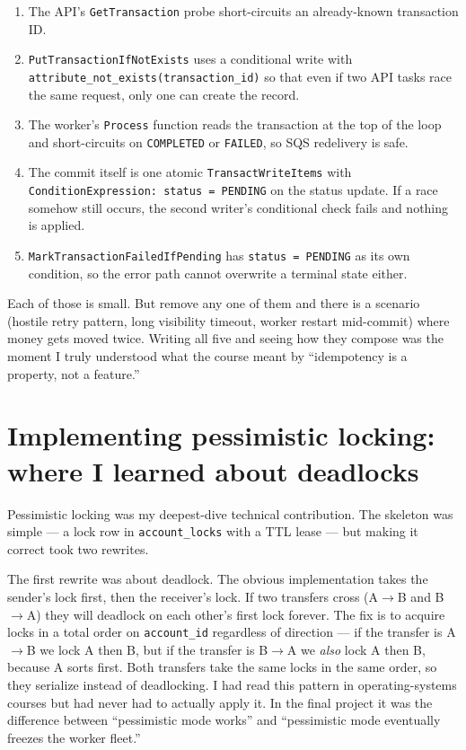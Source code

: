 \documentclass[11pt,a4paper]{article}
\begin{document}
\begin{enumerate}[leftmargin=*, itemsep=0.15em]
    \item The API's \texttt{GetTransaction} probe short-circuits an already-known transaction ID.
    \item \texttt{PutTransactionIfNotExists} uses a conditional write with \texttt{attribute\_not\_exists(transaction\_id)} so that even if two API tasks race the same request, only one can create the record.
    \item The worker's \texttt{Process} function reads the transaction at the top of the loop and short-circuits on \texttt{COMPLETED} or \texttt{FAILED}, so SQS redelivery is safe.
    \item The commit itself is one atomic \texttt{TransactWriteItems} with \texttt{ConditionExpression: status = PENDING} on the status update. If a race somehow still occurs, the second writer's conditional check fails and nothing is applied.
    \item \texttt{MarkTransactionFailedIfPending} has \texttt{status = PENDING} as its own condition, so the error path cannot overwrite a terminal state either.
\end{enumerate}

\begin{insightbox}
Each of those is small. But remove any one of them and there is a scenario (hostile retry pattern, long visibility timeout, worker restart mid-commit) where money gets moved twice. Writing all five and seeing how they compose was the moment I truly understood what the course meant by ``idempotency is a property, not a feature.''
\end{insightbox}

\section{Implementing pessimistic locking: where I learned about deadlocks}

Pessimistic locking was my deepest-dive technical contribution. The skeleton was simple --- a lock row in \texttt{account\_locks} with a TTL lease --- but making it correct took two rewrites.

The first rewrite was about deadlock. The obvious implementation takes the sender's lock first, then the receiver's lock. If two transfers cross (A$\rightarrow$B and B$\rightarrow$A) they will deadlock on each other's first lock forever. The fix is to acquire locks in a total order on \texttt{account\_id} regardless of direction --- if the transfer is A$\rightarrow$B we lock A then B, but if the transfer is B$\rightarrow$A we \textit{also} lock A then B, because A sorts first. Both transfers take the same locks in the same order, so they serialize instead of deadlocking. I had read this pattern in operating-systems courses but had never had to actually apply it. In the final project it was the difference between ``pessimistic mode works'' and ``pessimistic mode eventually freezes the worker fleet.''
\end{document}
